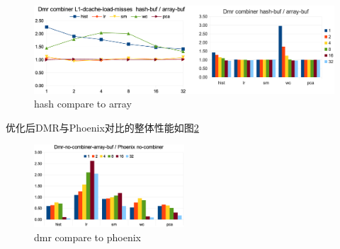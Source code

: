 \begin{figure}[!h!t]  
    \centering
    \includegraphics[width=1\textwidth]{img/dmr_hash_to_array.eps}
    \caption{hash compare to array}
    \label{dmr:hash-to-array}
\end{figure}


优化后DMR与Phoenix对比的整体性能如图\ref{dmr:time-array}
\begin{figure}[!h!t]  
    \centering
    \includegraphics[width=0.5\textwidth]{img/dmr_time_array.eps}
    \caption{dmr compare to phoenix}
    \label{dmr:time-array}
\end{figure}
